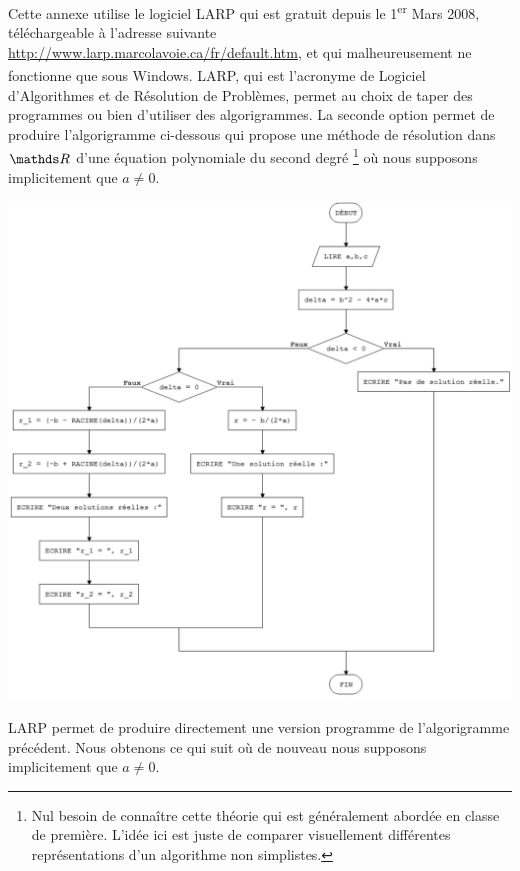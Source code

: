 Cette annexe utilise le logiciel LARP qui est gratuit depuis le 1\textsuperscript{er} Mars 2008, téléchargeable à l'adresse suivante \url{http://www.larp.marcolavoie.ca/fr/default.htm}, et qui malheureusement ne fonctionne que sous Windows\textsuperscript{\textcopyright}. 
LARP, qui est l'acronyme de Logiciel d'Algorithmes et de Résolution de Problèmes, permet au choix de taper des programmes ou bien d'utiliser des algorigrammes.
La seconde option permet de produire l'algorigramme ci-dessous qui propose une méthode de résolution dans $\RR$ d'une équation polynomiale du second degré
\footnote{
	Nul besoin de connaître cette théorie qui est généralement abordée en classe de première. L'idée ici est juste de comparer \og visuellement \fg{} différentes représentations d'un algorithme non simplistes.
}
où nous supposons implicitement que $a \neq  0$.

\begin{center}
	\includegraphics[width=1\textwidth]{reading/draw_limits/real_quadratic_equations.png}
\end{center}


LARP permet de produire directement une version \og programme \fg{} de l'algorigramme précédent. Nous obtenons ce qui suit où de nouveau nous supposons implicitement que $a \neq  0$.

\newpage

